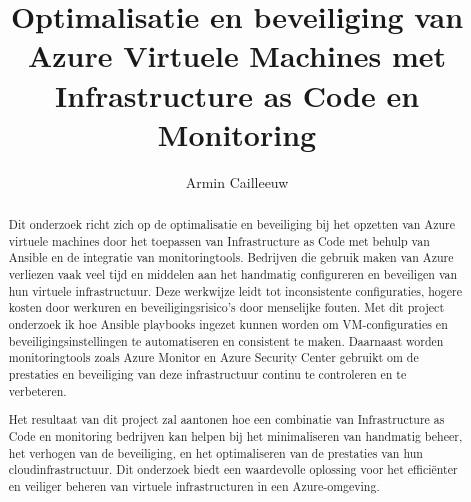 \documentclass{hogent-article}
\title{Optimalisatie en beveiliging van Azure Virtuele Machines met Infrastructure as Code en Monitoring}
\author{Armin Cailleeuw}
\begin{document}
\begin{abstract}
  Dit onderzoek richt zich op de optimalisatie en beveiliging bij het opzetten van Azure virtuele machines door het toepassen van Infrastructure as Code met behulp van Ansible en de integratie van monitoringtools.
  Bedrijven die gebruik maken van Azure verliezen vaak veel tijd en middelen aan het handmatig configureren en beveiligen van hun virtuele infrastructuur.
  Deze werkwijze leidt tot inconsistente configuraties, hogere kosten door werkuren en beveiligingsrisico's door menselijke fouten.
  Met dit project onderzoek ik hoe Ansible playbooks ingezet kunnen worden om VM-configuraties en beveiligingsinstellingen te automatiseren en consistent te maken.
  Daarnaast worden monitoringtools zoals Azure Monitor en Azure Security Center gebruikt om de prestaties en beveiliging van deze infrastructuur continu te controleren en te verbeteren.
  
  Het resultaat van dit project zal aantonen hoe een combinatie van Infrastructure as Code en monitoring bedrijven kan helpen bij het minimaliseren van handmatig beheer, het verhogen van de beveiliging, en het optimaliseren van de prestaties van hun cloudinfrastructuur.
  Dit onderzoek biedt een waardevolle oplossing voor het efficiënter en veiliger beheren van virtuele infrastructuren in een Azure-omgeving.
\end{abstract}

\tableofcontents



\printbibliography[heading=bibintoc]
\end{document}
